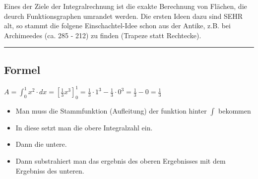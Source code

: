 \documentclass{article}
\begin{document}
Eines der Ziele der Integralrechnung ist die exakte Berechnung von Flächen, die deurch Funktionsgraphen umrandet werden. Die ersten Ideen dazu sind SEHR alt, so stammt die folgene Einschachtel-Idee schon aus der Antike, z.B. bei Archimeedes (ca. 285 - 212) zu finden (Trapeze statt Rechtecke).

\hrule

\subsection*{Formel}

$A = \int_{0}^{1} x^2 \cdot dx = [\frac{1}{3} x^3]_0^1 = \frac{1}{3} \cdot 1^3 -\frac{1}{3} \cdot 0^3 = \frac{1}{3} - 0 = \frac{1}{3}$

\begin{itemize}
\item Man muss die Stammfunktion (Aufleitung) der funktion hinter $\int$ bekommen
\item In diese setzt man die obere Integralzahl ein.
\item Dann die untere.
\item Dann substrahiert man das ergebnis des oberen Ergebnisses mit dem Ergebniss des unteren.
\end{itemize}
\end{document}
